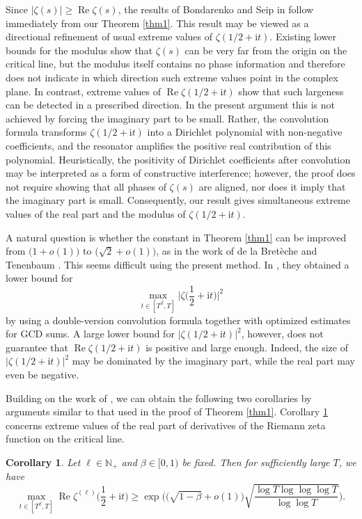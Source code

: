 \documentclass[12pt,reqno]{amsart}
\newtheorem{cor}{Corollary}
\theoremstyle{definition}
\numberwithin{equation}{section}
\newcommand{\bg}{\big}
\newcommand{\bgl}{\big(}
\newcommand{\bgr}{\big)}
\newcommand{\bggl}{\bigg(}
\newcommand{\bggr}{\bigg)}
\newcommand{\Bg}{\Big}
\newcommand{\Bgl}{\Big(}
\newcommand{\Bgr}{\Big)}
\newcommand{\mbn}{\mathbb{N}}
\newcommand{\mit}{\mathrm{i}t}
\newcommand{\re}{\operatorname{Re}}
\begin{document}
\par
Since \(|\zeta(s)| \ge \re \zeta(s)\), the results of Bondarenko and Seip in \cite{bondarenko2017large,bondarenko2018argument} follow immediately from our Theorem \ref{thm1}. This result may be viewed as a directional refinement of usual extreme values of \(\zeta(1/2+\mit)\). Existing lower bounds for the modulus show that \(\zeta(s)\) can be very far from the origin on the critical line, but the modulus itself contains no phase information and therefore does not indicate in which direction such extreme values point in the complex plane. In contrast, extreme values of \(\re\zeta(1/2+\mit)\) show that such largeness can be detected in a prescribed direction. In the present argument this is not achieved by forcing the imaginary part to be small. Rather, the convolution formula transforms \(\zeta(1/2+\mit)\) into a Dirichlet polynomial with non-negative coefficients, and the resonator amplifies the positive real contribution of this polynomial. Heuristically, the positivity of Dirichlet coefficients after convolution may be interpreted as a form of constructive interference; however, the proof does not require showing that all phases of \(\zeta(s)\) are aligned, nor does it imply that the imaginary part is small. Consequently, our result gives simultaneous extreme values of the real part and the modulus of \(\zeta(1/2+\mit)\).
\par
A natural question is whether the constant in Theorem \ref{thm1} can be improved from  \(\bg(1+o(1)\bg)\) to \(\bgl \sqrt{2}+o(1) \bgr\), as in the work of de la Bretèche and Tenenbaum \cite{dlB2019galsum}. This seems difficult using the present method. In \cite{dlB2019galsum}, they obtained a lower bound for 
\[
\max_{t \in [T^\beta,T]}\Bg|\zeta\Bg(\frac{1}{2}+\mit\Bg)\Bg|^2
\]
by using a double-version convolution formula together with optimized estimates for GCD sums. A large lower bound for \(|\zeta(1/2+\mit)|^2\), however, does not guarantee that \(\re \zeta(1/2+\mit)\) is positive and large enough. Indeed, the size of \(|\zeta(1/2+\mit)|^2\) may be dominated by the imaginary part, while the real part may even be negative.
\par
Building on the work of \cite{dong2023Onde, yang2022extreme, YANG2026jmaa}, we can obtain the following two corollaries by arguments similar to that used in the proof of Theorem \ref{thm1}. Corollary \ref{cor1} concerns extreme values of the real part of derivatives of the Riemann zeta function on the critical line.
\begin{cor}
\label{cor1}
    Let \(\ell \in \mbn_+\) and \(\beta \in [0,1)\) be fixed. Then for sufficiently large \(T\), we have
    \[
    \max_{t \in [T^\beta,T]} \re \zeta^{(\ell)} \Bgl\frac{1}{2}+\mit\Bgr \ge \exp\bggl\bgl\sqrt{1-\beta}+o(1)\bgr\sqrt{\frac{\log T \log\log\log T}{\log\log T}} \bggr.
    \]
\end{cor}
\end{document}

